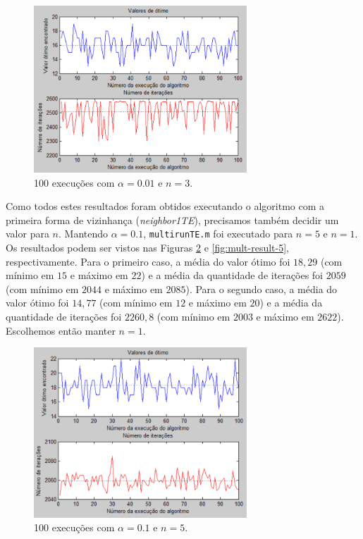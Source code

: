 \documentclass[conference]{IEEEtran}
\begin{document}
	\begin{figure}[h]
		\centering
		\includegraphics[width=8cm]{img/mult-result-3.png}
		\caption{100 execuções com $\alpha = 0.01$ e $n = 3$.}
		\label{fig:mult-result-3}
	\end{figure}
	
Como todos estes resultados foram obtidos executando o algoritmo com a primeira forma de vizinhança (\textit{neighbor1TE}), precisamos também decidir um valor para $n$. Mantendo $\alpha = 0.1$, \texttt{multirunTE.m} foi executado para $n = 5$ e $n = 1$. Os resultados podem ser vistos nas Figuras \ref{fig:mult-result-4} e \ref{fig:mult-result-5}, respectivamente. Para o primeiro caso, a média do valor ótimo foi $18,29$ (com mínimo em $15$ e máximo em $22$) e a média da quantidade de iterações foi $2059$ (com mínimo em $2044$ e máximo em $2085$). Para o segundo caso, a média do valor ótimo foi $14,77$ (com mínimo em $12$ e máximo em $20$) e a média da quantidade de iterações foi $2260,8$ (com mínimo em $2003$ e máximo em $2622$). Escolhemos então manter $n = 1$.

	\begin{figure}[h]
		\centering
		\includegraphics[width=8cm]{img/mult-result-4.png}
		\caption{100 execuções com $\alpha = 0.1$ e $n = 5$.}
		\label{fig:mult-result-4}
	\end{figure}
	
\end{document}
